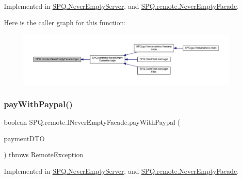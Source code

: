 Implemented in \mbox{\hyperlink{class_s_p_q_1_1_never_empty_server_a79e3b01cc25be204f24e01c7fccbef13}{S\+P\+Q.\+Never\+Empty\+Server}}, and \mbox{\hyperlink{class_s_p_q_1_1remote_1_1_never_empty_facade_a3fdd96efa1256ea520a497b8a20578e8}{S\+P\+Q.\+remote.\+Never\+Empty\+Facade}}.

Here is the caller graph for this function\+:
\nopagebreak
\begin{figure}[H]
\begin{center}
\leavevmode
\includegraphics[width=350pt]{interface_s_p_q_1_1remote_1_1_i_never_empty_facade_a2440fa36695c63e4e4c30fc25965f853_icgraph}
\end{center}
\end{figure}
\mbox{\label{interface_s_p_q_1_1remote_1_1_i_never_empty_facade_a2d34c64f91537d8c7138094e418de785}} 
\subsubsection{\texorpdfstring{pay\+With\+Paypal()}{payWithPaypal()}}
{\footnotesize\ttfamily boolean S\+P\+Q.\+remote.\+I\+Never\+Empty\+Facade.\+pay\+With\+Paypal (\begin{DoxyParamCaption}\item[{\mbox{\hyperlink{class_s_p_q_1_1dto_1_1_payment_d_t_o}{Payment\+D\+TO}}}]{payment\+D\+TO }\end{DoxyParamCaption}) throws Remote\+Exception}



Implemented in \mbox{\hyperlink{class_s_p_q_1_1_never_empty_server_a954ea8c563055eae79564b357e557f85}{S\+P\+Q.\+Never\+Empty\+Server}}, and \mbox{\hyperlink{class_s_p_q_1_1remote_1_1_never_empty_facade_a9942c7930b5144f0677dc0fdcde25cc3}{S\+P\+Q.\+remote.\+Never\+Empty\+Facade}}.

